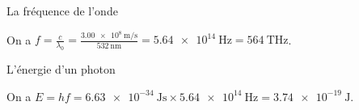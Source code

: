 	
	\begin{enonce}
		La fréquence de l'onde 
	\end{enonce}
	
	
	\begin{corrige}
		On a $f=\frac{c}{\lambda_0}=\frac{\SI{3,00e8}{\meter\per\second}}{\SI{532}{\nano\meter}}=\SI{5,64e14}{\hertz}=\SI{564}{\tera\hertz}$.
	\end{corrige}
	
	
	
	\begin{enonce}
		L'énergie d'un photon
	\end{enonce}
	
	
	\begin{corrige}
		On a $E=hf=\SI{6,63e-34}{\joule\second}\times\SI{5.64e14}{\hertz}=\SI{3,74e-19}{\joule}$.
	\end{corrige}
	
	\finEntrainement
	
	
	
	
	
	
	
	\titreEntrainementFacultatif	{}
	\hauteurLargeurCadreReponse		{8mm}{1.5cm}
	\initialisationEntrainement
	
